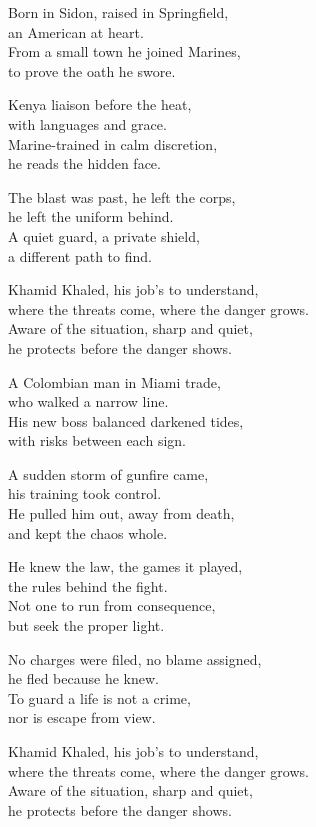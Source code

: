 \begin{lyrics}
Born in Sidon, raised in Springfield,\\
an American at heart.\\
From a small town he joined Marines,\\
to prove the oath he swore.

Kenya liaison before the heat,\\
with languages and grace.\\
Marine-trained in calm discretion,\\
he reads the hidden face.

The blast was past, he left the corps,\\
he left the uniform behind.\\
A quiet guard, a private shield,\\
a different path to find.

Khamid Khaled, his job's to understand,\\
where the threats come, where the danger grows.\\
Aware of the situation, sharp and quiet,\\
he protects before the danger shows.

A Colombian man in Miami trade,\\
who walked a narrow line.\\
His new boss balanced darkened tides,\\
with risks between each sign.

A sudden storm of gunfire came,\\
his training took control.\\
He pulled him out, away from death,\\
and kept the chaos whole.

He knew the law, the games it played,\\
the rules behind the fight.\\
Not one to run from consequence,\\
but seek the proper light.

No charges were filed, no blame assigned,\\
he fled because he knew.\\
To guard a life is not a crime,\\
nor is escape from view.

Khamid Khaled, his job's to understand,\\
where the threats come, where the danger grows.\\
Aware of the situation, sharp and quiet,\\
he protects before the danger shows.


\end{lyrics}
